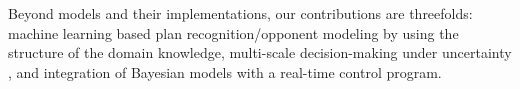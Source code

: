 Beyond models and their implementations, our contributions are threefolds: machine learning based plan recognition/opponent modeling %
by using the structure of the domain knowledge, multi-scale decision-making under uncertainty%
, and integration of Bayesian models with a real-time control program.

